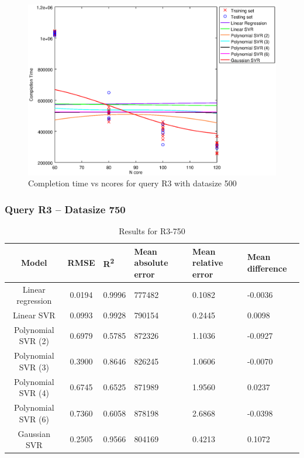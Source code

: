 \documentclass[a4paper,11pt]{article}
\begin{document}
\begin {figure}[hbtp]
\centering
\includegraphics[width=\textwidth]{output/R3_500_LINEAR_NCORE/plot_R3_500.eps}
\caption{Completion time vs ncores for query R3 with datasize 500}
\label{fig:all_linear_R3_500}
\end {figure}

\newpage
\subsubsection{Query R3 -- Datasize 750}
\begin{table}[H]
	\centering
	\begin{adjustbox}{center}
		\begin{tabular}{c | c M{1.2cm} M{2.5cm} M{2.5cm} M{1.8cm}}
			Model & RMSE & R\textsuperscript{2} & Mean absolute error & Mean relative error & Mean difference \tabularnewline
			\hline
			Linear regression & 0.0194 & 0.9996 & 777482 & 0.1082 & -0.0036 \\
			Linear SVR & 0.0993 & 0.9928 & 790154 & 0.2445 & 0.0098 \\
			Polynomial SVR (2) & 0.6979 & 0.5785 & 872326 & 1.1036 & -0.0927 \\
			Polynomial SVR (3) & 0.3900 & 0.8646 & 826245 & 1.0606 & -0.0070 \\
			Polynomial SVR (4) & 0.6745 & 0.6525 & 871989 & 1.9560 & 0.0237 \\
			Polynomial SVR (6) & 0.7360 & 0.6058 & 878198 & 2.6868 & -0.0398 \\
			Gaussian SVR & 0.2505 & 0.9566 & 804169 & 0.4213 & 0.1072 \\
		\end{tabular}
	\end{adjustbox}
	\\
	\caption{Results for R3-750}
	\label{fig:all_linear_R3_750}
\end{table}
\end{document}
